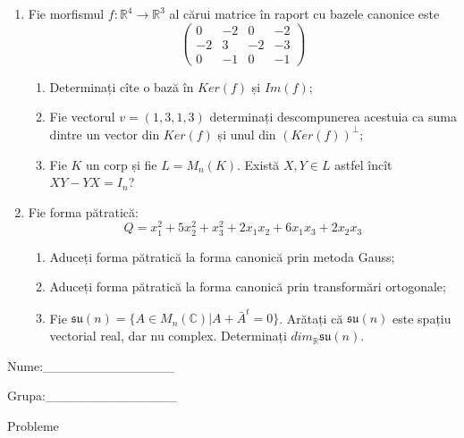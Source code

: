 \documentclass{article}
\begin{document}
\begin{enumerate}
 \item Fie morfismul $f:\mathbb{R}^4 \to \mathbb{R}^3$ al cărui matrice în raport cu bazele canonice este
$$\begin{pmatrix}
0&-2&0&-2\\
-2&3&-2&-3\\
0&-1&0&-1
\end{pmatrix}$$

\begin{enumerate}
\item Determinați cîte o bază în $Ker(f)$ și $Im(f)$;
\item Fie vectorul $v=(1,3,1,3)$ determinați descompunerea acestuia ca suma dintre un vector din $Ker(f)$ și unul din $(Ker(f))^\perp$;
\item Fie $K$ un corp și fie $L=M_n(K)$. Există $X,Y \in L$ astfel încît $XY-YX=I_n$?  
\end{enumerate}
\item Fie forma pătratică:
$$Q= x_1^2+5x_2^2+x_3^2+2x_1x_2+6x_1x_3+2x_2x_3$$

\begin{enumerate}
\item Aduceți forma pătratică la forma canonică prin metoda Gauss;
\item Aduceți forma pătratică la forma canonică prin transformări ortogonale;
\item Fie $\mathfrak{su}(n)=\{ A \in M_n(\mathbb{C}) | A+\bar{A}^t=0\}$. Arătați că $\mathfrak{su}(n)$ este spațiu vectorial real, dar nu complex.
Determinați $dim_{\mathbb{R}}\mathfrak{su}(n)$.
\end{enumerate}
\end{enumerate}
\newpage
\begin{flushright}
Nume:\_\_\_\_\_\_\_\_\_\_\_\_\_\_
 
 
Grupa:\_\_\_\_\_\_\_\_\_\_\_\_\_\_
\end{flushright}
\begin{center}
\vspace{2cm}
{\Large Probleme}
\vspace{2cm}
\end{center}
\end{document}
